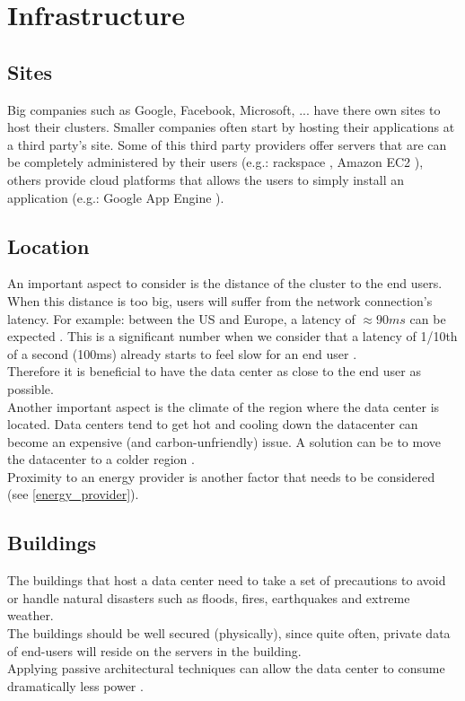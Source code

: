 \documentclass[12pt]{report}
\begin{document}
\section{Infrastructure}
\subsection{Sites}
Big companies such as Google, Facebook, Microsoft, ... have there own
sites to host their clusters. Smaller companies often start by hosting
their applications at a third party's site. Some of this third party
providers offer servers that are can be completely administered by their
users (e.g.: rackspace \cite{rackspace}, Amazon EC2 \cite{amazon_ec2}), others provide cloud
platforms that allows the users to simply install an application
(e.g.: Google App Engine \cite{google_app_engine}).

\subsection{Location}
An important aspect to consider is the distance of
the cluster to the end users. When this distance is too big, users will suffer from the
network connection's latency. For example: between the US
and Europe, a latency of $\approx 90ms$ can be expected
\cite{verizon_latency}.
This is a significant number when we consider that a latency of 1/10th
of a second (100ms) already starts to feel slow for an end user 
\cite{web_app_latency}.\\
Therefore it is beneficial to have the data center as close to the end
user as possible.\\

Another important aspect is the climate of the region where the data
center is located. Data centers tend to get hot and cooling down the
datacenter can become an expensive (and carbon-unfriendly) issue.
A solution can be to move the datacenter to a colder region 
\cite{datacenter_cold}.\\

Proximity to an energy provider is another factor that needs to be
considered (see \cref{energy_provider}).

\subsection{Buildings}
The buildings that host a data center need to take a set of precautions to
avoid or handle natural disasters such as floods, fires, earthquakes
and extreme weather.\\
The buildings should be well secured (physically), since quite often, 
private data of end-users will reside on the servers in the
building.\\
Applying passive architectural techniques can allow
the data center to consume dramatically less power \cite{passive_architecture}.
 
\end{document}
